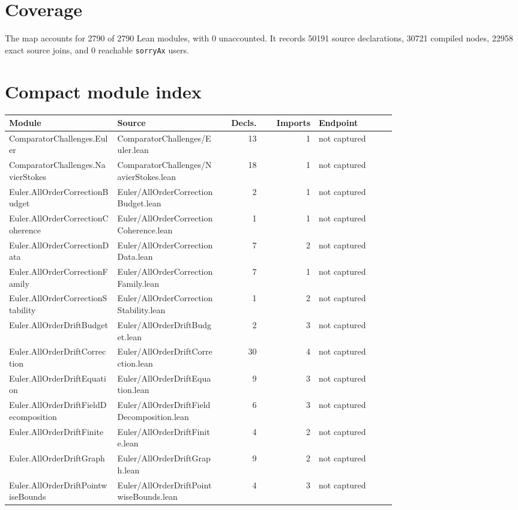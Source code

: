 \documentclass[10pt]{article}
\begin{document}
\section*{Coverage}
The map accounts for 2790 of 2790 Lean modules, with 0 unaccounted. It records 50191 source declarations, 30721 compiled nodes, 22958 exact source joins, and 0 reachable \texttt{sorryAx} users.
\section*{Compact module index}
\begin{longtable}{p{0.28\linewidth}p{0.27\linewidth}r r p{0.20\linewidth}}\toprule Module & Source & Decls. & Imports & Endpoint\\\midrule
ComparatorChallenges.Euler & ComparatorChallenges/Euler.lean & 13 & 1 & not captured\\
ComparatorChallenges.NavierStokes & ComparatorChallenges/NavierStokes.lean & 18 & 1 & not captured\\
Euler.AllOrderCorrectionBudget & Euler/AllOrderCorrectionBudget.lean & 2 & 1 & not captured\\
Euler.AllOrderCorrectionCoherence & Euler/AllOrderCorrectionCoherence.lean & 1 & 1 & not captured\\
Euler.AllOrderCorrectionData & Euler/AllOrderCorrectionData.lean & 7 & 2 & not captured\\
Euler.AllOrderCorrectionFamily & Euler/AllOrderCorrectionFamily.lean & 7 & 1 & not captured\\
Euler.AllOrderCorrectionStability & Euler/AllOrderCorrectionStability.lean & 1 & 2 & not captured\\
Euler.AllOrderDriftBudget & Euler/AllOrderDriftBudget.lean & 2 & 3 & not captured\\
Euler.AllOrderDriftCorrection & Euler/AllOrderDriftCorrection.lean & 30 & 4 & not captured\\
Euler.AllOrderDriftEquation & Euler/AllOrderDriftEquation.lean & 9 & 3 & not captured\\
Euler.AllOrderDriftFieldDecomposition & Euler/AllOrderDriftFieldDecomposition.lean & 6 & 3 & not captured\\
Euler.AllOrderDriftFinite & Euler/AllOrderDriftFinite.lean & 4 & 2 & not captured\\
Euler.AllOrderDriftGraph & Euler/AllOrderDriftGraph.lean & 9 & 2 & not captured\\
Euler.AllOrderDriftPointwiseBounds & Euler/AllOrderDriftPointwiseBounds.lean & 4 & 3 & not captured\\

\end{longtable}
\end{document}
